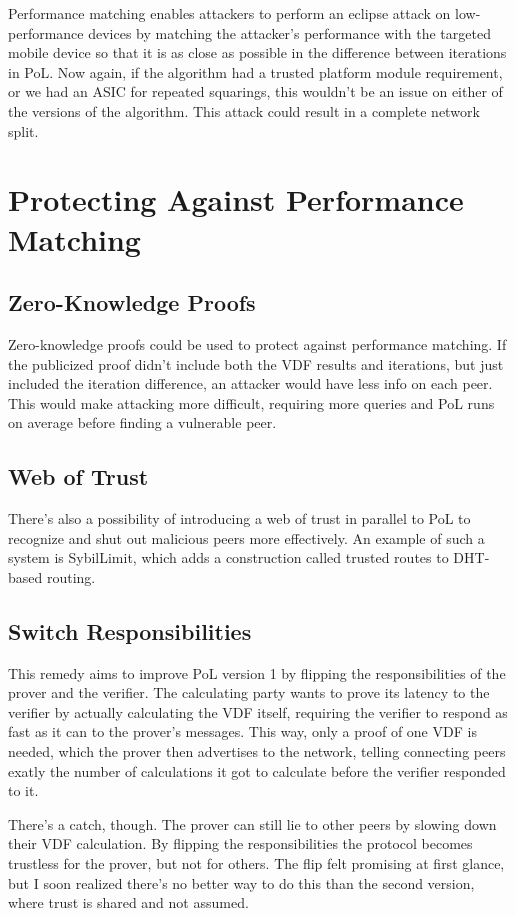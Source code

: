 Performance matching enables attackers to perform an eclipse attack on low-performance devices by matching the attacker's performance with the targeted mobile device so that it is as close as possible in the difference between iterations in PoL. Now again, if the algorithm had a trusted platform module requirement, or we had an ASIC for repeated squarings, this wouldn't be an issue on either of the versions of the algorithm. This attack could result in a complete network split.

\section{Protecting Against Performance Matching}
\subsection{Zero-Knowledge Proofs}
Zero-knowledge proofs could be used to protect against performance matching. If the publicized proof didn't include both the VDF results and iterations, but just included the iteration difference, an attacker would have less info on each peer. This would make attacking more difficult, requiring more queries and PoL runs on average before finding a vulnerable peer.

\subsection{Web of Trust}
There's also a possibility of introducing a web of trust in parallel to PoL to recognize and shut out malicious peers more effectively. An example of such a system is SybilLimit, which adds a construction called trusted routes to DHT-based routing.\cite{Yu2008-xl}

\subsection{Switch Responsibilities}
This remedy aims to improve PoL version 1 by flipping the responsibilities of the prover and the verifier. The calculating party wants to prove its latency to the verifier by actually calculating the VDF itself, requiring the verifier to respond as fast as it can to the prover's messages. This way, only a proof of one VDF is needed, which the prover then advertises to the network, telling connecting peers exatly the number of calculations it got to calculate before the verifier responded to it. 

There's a catch, though. The prover can still lie to other peers by slowing down their VDF calculation. By flipping the responsibilities the protocol becomes trustless for the prover, but not for others. The flip felt promising at first glance, but I soon realized there's no better way to do this than the second version, where trust is shared and not assumed.


